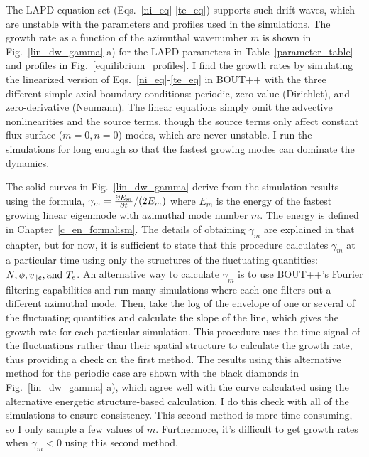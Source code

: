 The LAPD equation set (Eqs.~\ref{ni_eq}-\ref{te_eq}) supports such drift waves, which are unstable with the parameters and profiles used in the simulations. 
The growth rate as a function of the azimuthal
wavenumber $m$ is shown in Fig.~\ref{lin_dw_gamma} a) for the LAPD parameters in Table~\ref{parameter_table} and profiles in Fig.~\ref{equilibrium_profiles}. I find the growth rates by simulating
the linearized version of Eqs.~\ref{ni_eq}-\ref{te_eq} in BOUT++ with the three different simple axial boundary conditions: periodic, zero-value (Dirichlet), and zero-derivative (Neumann). 
The linear equations simply omit the advective nonlinearities and the source terms, though the source terms only affect constant flux-surface ($m=0, n=0$) modes, which are never unstable. 
I run the simulations for long enough so that the fastest growing modes can dominate the dynamics.

The solid curves in Fig.~\ref{lin_dw_gamma} derive from the simulation results using the formula, $\gamma_m = \frac{\partial E_m}{\partial t}/(2 E_m)$ where $E_m$ is the energy of the fastest
growing linear eigenmode with azimuthal mode number $m$.
The energy is defined in Chapter~\ref{c_en_formalism}. The details of obtaining $\gamma_m$ are explained in that chapter, but for now, it is sufficient to state that this procedure calculates
$\gamma_m$ at a particular time using only the structures of the fluctuating quantities: $N, \phi, \vpe, {\rm and } \ T_e$. An alternative way to calculate $\gamma_m$ is to use BOUT++'s Fourier
filtering capabilities and run many simulations where each one filters out a different azimuthal mode. Then, take the log of the envelope of one or several of the fluctuating quantities
and calculate the slope of the line, which gives the growth rate for each particular simulation. This procedure uses the time signal of the fluctuations rather than their spatial structure to
calculate the growth rate, thus providing a check on the first method. 
The results using this alternative method for the periodic case are shown with the black diamonds in Fig.~\ref{lin_dw_gamma} a), which agree well with the curve calculated using the 
alternative energetic structure-based calculation. I do this check with all of the simulations to ensure consistency. This second method is more time consuming, so I only sample a few values of $m$.
Furthermore, it's difficult to get growth rates when $\gamma_m < 0$ using this second method.

